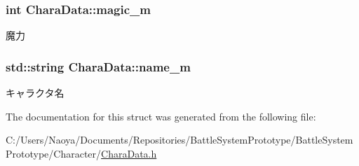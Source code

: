 \subsubsection[{magic\+\_\+m}]{\setlength{\rightskip}{0pt plus 5cm}int Chara\+Data\+::magic\+\_\+m}\label{struct_chara_data_ad76e5c9e2a90755979af927101ec43ac}
魔力 \hypertarget{struct_chara_data_a96f453c506c225341d2752d4888d515e}{}
\subsubsection[{name\+\_\+m}]{\setlength{\rightskip}{0pt plus 5cm}std\+::string Chara\+Data\+::name\+\_\+m}\label{struct_chara_data_a96f453c506c225341d2752d4888d515e}
キャラクタ名 

The documentation for this struct was generated from the following file\+:\begin{DoxyCompactItemize}
\item 
C\+:/\+Users/\+Naoya/\+Documents/\+Repositories/\+Battle\+System\+Prototype/\+Battle\+System\+Prototype/\+Character/\hyperlink{_chara_data_8h}{Chara\+Data.\+h}\end{DoxyCompactItemize}
